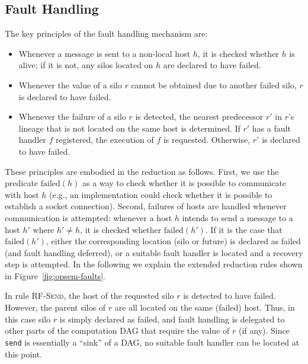 \documentclass[10pt]{sigplanconf}
\theoremstyle{definition}
\theoremstyle{definition}
\begin{document}
\subsection{Fault Handling}
\label{sec:faults-opsem}
The key principles of the fault handling mechanism are:
\begin{itemize}
\item Whenever a message is sent to a non-local host $h$, it is checked whether
  $h$ is alive; if it is not, any silos located on $h$ are declared to have
  failed.
\item Whenever the value of a silo $r$ cannot be obtained due to another failed
  silo, $r$ is declared to have failed.
\item Whenever the failure of a silo $r$ is detected, the nearest predecessor
  $r'$ in $r$'s lineage that is not located on the same host is determined. If
  $r'$ has a fault handler $f$ registered, the execution of $f$ is requested.
  Otherwise, $r'$ is declared to have failed.
\end{itemize}


These principles are embodied in the reduction as follows. First, we use the
predicate $\text{failed}(h)$ as a way to check whether it is possible to
communicate with host $h$ (e.g., an implementation could check whether it is
possible to establish a socket connection). Second, failures of hosts are
handled whenever communication is attempted: whenever a host $h$ intends to
send a message to a host $h'$ where $h' \neq h$, it is checked whether
$\text{failed}(h')$. If it is the case that $\text{failed}(h')$, either the
corresponding location (silo or future) is declared as failed (and fault
handling deferred), or a suitable fault handler is located and a recovery step
is attempted. In the following we explain the extended reduction rules shown in
Figure~\ref{fig:opsem-faults}.

In rule \textsc{RF-Send}, the host of the requested silo $r$ is detected to
have failed. However, the parent silos of $r$ are all located on the same
(failed) host. Thus, in this case silo $r$ is simply declared as failed, and
fault handling is delegated to other parts of the computation DAG that require
the value of $r$ (if any). Since \texttt{send} is essentially a ``sink'' of a
DAG, no suitable fault handler can be located at this point.
\end{document}
